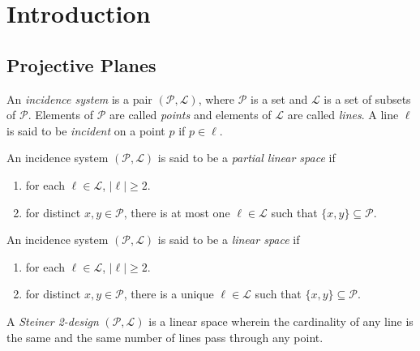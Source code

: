 \section{Introduction}

\subsection{Projective Planes}

	\begin{fdef}
		An \emph{incidence system} is a pair $(\mathcal{P},\mathcal{L})$, where $\mathcal{P}$ is a set and $\mathcal{L}$ is a set of subsets of $\mathcal{P}$. Elements of $\mathcal{P}$ are called \emph{points} and elements of $\mathcal{L}$ are called \emph{lines}. A line $\ell$ is said to be \emph{incident} on a point $p$ if $p \in \ell$.\\
	\end{fdef}

	\begin{fdef}
		An incidence system $(\mathcal{P},\mathcal{L})$ is said to be a \emph{partial linear space} if
		\begin{enumerate}
		 	\item for each $\ell \in \mathcal{L}$, $|\ell| \ge 2$.
		 	\item for distinct $x,y \in \mathcal{P}$, there is at most one $\ell \in \mathcal{L}$ such that $\{x,y\} \subseteq \mathcal{P}$.
		\end{enumerate}
	\end{fdef}

	\begin{fdef}
		An incidence system $(\mathcal{P},\mathcal{L})$ is said to be a \emph{linear space} if
		\begin{enumerate}
		 	\item for each $\ell \in \mathcal{L}$, $|\ell| \ge 2$.
		 	\item for distinct $x,y \in \mathcal{P}$, there is a unique $\ell \in \mathcal{L}$ such that $\{x,y\} \subseteq \mathcal{P}$.
		\end{enumerate}
	\end{fdef}

	\begin{fdef}
		A \emph{Steiner 2-design} $(\mathcal{P},\mathcal{L})$ is a linear space wherein the cardinality of any line is the same and the same number of lines pass through any point.
	\end{fdef}

